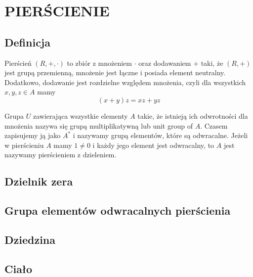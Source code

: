 \section{PIERŚCIENIE}

\subsection{Definicja}

{\color{def}Pierścień} $(R, +, \cdot)$ to zbiór z mnożeniem $\cdot$ oraz dodawaniem $+$ taki, że $(R, +)$ jest grupą przemienną, mnożenie jest łączne i posiada element neutralny. Dodatkowo, dodawanie jest rozdzielne względem mnożenia, czyli dla wszystkich $x,y,z\in A$ mamy
$$(x+y)z=xz+yz$$

Grupa $U$ zawierająca wszystkie elementy $A$ takie, że istnieją ich odwrotności dla mnożenia nazywa się {\color{def}grupą multiplikatywną} lub {\color{acc}unit group of $A$}. Czasem zapisujemy ją jako $A^*$ i nazywamy grupą elementów, które są {\color{acc}odwracalne}. Jeżeli w pierścieniu $A$ mamy $1\neq0$ i każdy jego element jest odwracalny, to $A$ jest nazywamy {\color{def}pierścieniem z dzieleniem}.

\subsection{Dzielnik zera}

\subsection{Grupa elementów odwracalnych pierścienia}

\subsection{Dziedzina}

\subsection{Ciało}